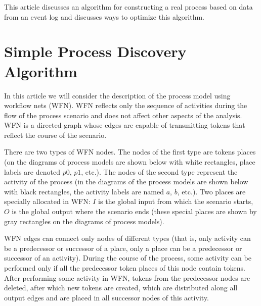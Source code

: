 \documentclass[
11pt,%
tightenlines,%
twoside,%
onecolumn,%
nofloats,%
nobibnotes,%
nofootinbib,%
superscriptaddress,%
noshowpacs,%
centertags]%
{revtex4}
\begin{document}
This article discusses an algorithm for constructing a real process based on data from an event log and discusses ways to optimize this algorithm.

\section{Simple Process Discovery Algorithm}

In this article we will consider the description of the process model using workflow nets (WFN).
WFN reflects only the sequence of activities during the flow of the process scenario and does not affect other aspects of the analysis.
WFN is a directed graph whose edges are capable of transmitting tokens that reflect the course of the scenario.

There are two types of WFN nodes.
The nodes of the first type are tokens places (on the diagrams of process models are shown below with white rectangles, place labels are denoted $p0$, $p1$, etc.).
The nodes of the second type represent the activity of the process (in the diagrams of the process models are shown below with black rectangles, the activity labels are named $a$, $b$, etc.).
Two places are specially allocated in WFN: $I$ is the global input from which the scenario starts, $O$ is the global output where the scenario ends (these special places are shown by gray rectangles on the diagrams of process models).

WFN edges can connect only nodes of different types (that is, only activity can be a predecessor or successor of a place, only a place can be a predecessor or successor of an activity).
During the course of the process, some activity can be performed only if all the predecessor token places of this node contain tokens.
After performing some activity in WFN, tokens from the predecessor nodes are deleted, after which new tokens are created, which are distributed along all output edges and are placed in all successor nodes of this activity.
\end{document}
